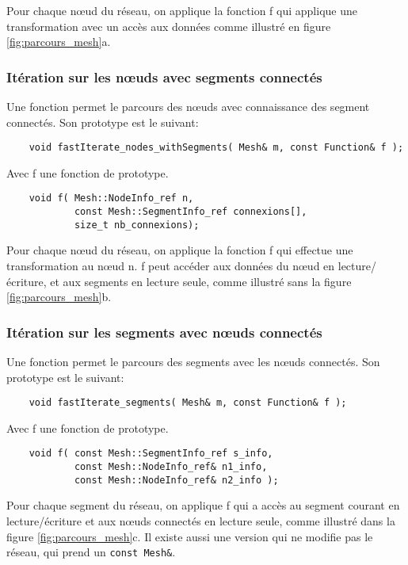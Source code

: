 Pour chaque nœud du réseau, on applique la fonction f qui applique une transformation avec un accès aux données comme illustré en figure \ref{fig:parcours_mesh}a.

\subsubsection{Itération sur les nœuds avec segments connectés}

Une fonction permet le parcours des nœuds avec connaissance des segment connectés.  Son prototype est le suivant:

\begin{verbatim}
    void fastIterate_nodes_withSegments( Mesh& m, const Function& f );
\end{verbatim}
Avec f une fonction de prototype.
\begin{verbatim}
    void f( Mesh::NodeInfo_ref n, 
    		const Mesh::SegmentInfo_ref connexions[], 
    		size_t nb_connexions);
\end{verbatim}

Pour chaque nœud du réseau, on applique la fonction f qui effectue une transformation au nœud n. f peut accéder aux données du nœud en lecture/écriture, et aux segments en lecture seule, comme illustré sans la figure \ref{fig:parcours_mesh}b.

\subsubsection{Itération sur les segments avec nœuds connectés}

Une fonction permet le parcours des segments avec les nœuds connectés. Son prototype est le suivant:

\begin{verbatim}
    void fastIterate_segments( Mesh& m, const Function& f );
\end{verbatim}
Avec f une fonction de prototype.
\begin{verbatim}
    void f( const Mesh::SegmentInfo_ref s_info,
    		const Mesh::NodeInfo_ref& n1_info, 
    		const Mesh::NodeInfo_ref& n2_info );
\end{verbatim}

Pour chaque segment du réseau, on applique f qui a accès au segment courant en lecture/écriture et aux nœuds connectés en lecture seule, comme illustré dans la figure \ref{fig:parcours_mesh}c. Il existe aussi une version qui ne modifie pas le réseau, qui prend un \verb|const Mesh&|.

